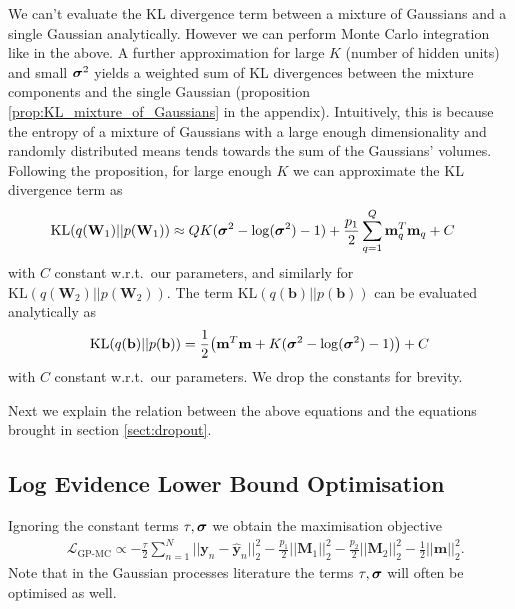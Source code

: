 \documentclass{article} %
\newcommand{\cL}{\mathcal{L}}
\newcommand{\Bb}{\mathbf{b}}
\newcommand{\y}{\mathbf{y}}
\newcommand{\W}{\mathbf{W}}
\newcommand{\m}{\mathbf{m}}
\newcommand{\M}{\mathbf{M}}
\newcommand{\bsigma}{\text{\boldmath$\sigma$}}
\newcommand{\KL}{\text{KL}}
\theoremstyle{definition}
\begin{document}
We can't evaluate the KL divergence term between a mixture of Gaussians and a single Gaussian analytically. However we can perform Monte Carlo integration like in the above. A further approximation for large $K$ (number of hidden units) and small $\bsigma^2$ yields a weighted sum of KL divergences between the mixture components and the single Gaussian (proposition \ref{prop:KL_mixture_of_Gaussians} in the appendix). Intuitively, this is because the entropy of a mixture of Gaussians with a large enough dimensionality and randomly distributed means tends towards the sum of the Gaussians' volumes.
Following the proposition, for large enough $K$ we can approximate the KL divergence term as 
\begin{align*}
&\KL(q(\W_1) || p(\W_1)) \approx QK(\bsigma^2 - \log(\bsigma^2) - 1) + \frac{p_1}{2} \sum_{q=1}^Q \m_q^T \m_q + C
\end{align*}
with $C$ constant w.r.t.\ our parameters, 
and similarly for $\KL(q(\W_2) || p(\W_2))$. The term $\KL(q(\Bb) || p(\Bb))$ can be evaluated analytically as
\begin{align*}
\KL(q(\Bb) || p(\Bb)) = \frac{1}{2} \big( \m^T\m + K(\bsigma^2 - \log(\bsigma^2) - 1) \big) + C
\end{align*}
with $C$ constant w.r.t.\ our parameters. We drop the constants for brevity.

Next we explain the relation between the above equations and the equations brought in section \ref{sect:dropout}.

\subsection{Log Evidence Lower Bound Optimisation}

Ignoring the constant terms $\tau, \bsigma$ we obtain the maximisation objective
\begin{align} \label{eq:L:GP-MC}
&\cL_{\text{GP-MC}} \propto - \frac{\tau}{2} \sum_{n=1}^N || \y_n - \widehat{\y}_n ||^2_2 - \frac{p_1}{2} ||\M_1||^2_2 - \frac{p_2}{2} ||\M_2||^2_2 - \frac{1}{2}||\m||^2_2.
\end{align}
Note that in the Gaussian processes literature the terms $\tau, \bsigma$ will often be optimised as well. 
\end{document}
